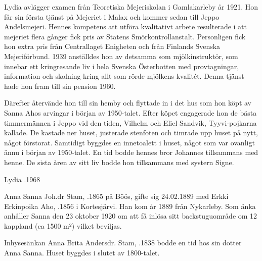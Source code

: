 Lydia avlägger examen från Teoretiska Mejeriskolan i Gamlakarleby år 1921. Hon får sin första tjänst på Mejeriet i Malax och kommer sedan till Jeppo Andelsmejeri. Hennes kompetens att utföra kvalitativt arbete resulterade i att mejeriet flera gånger fick pris av Statens Smörkontrollanstalt. Personligen fick hon extra pris från Centrallaget Enigheten och från Finlands Svenska Mejeriförbund. 1939 anställdes hon av detsamma som mjölkinstruktör, som innebar ett kringresande liv i hela Svenska Österbotten med provtagningar, information och skolning kring allt som rörde mjölkens kvalitét. Denna tjänst hade hon fram till sin pension 1960.

Därefter återvände hon till sin hemby och flyttade in i det hus som hon köpt av Sanna Ahos arvingar i början av 1950-talet. Efter köpet engagerade hon de bästa timmermännen i Jeppo vid den tiden, Vilhelm och Eliel Sandvik, Tyyvi-pojkarna kallade. De kastade ner huset, justerade stenfoten och timrade upp huset på nytt, något förstorat. Samtidigt byggdes en innetoalett i huset, något som var ovanligt ännu i början av 1950-talet. En tid bodde hennes bror Johannes tillsammans med henne. De sista åren av sitt liv bodde hon tillsammans med systern Signe.

Lydia .1968


%
Anna Sanna Joh.dr Stam, .1865 på Böös, gifte sig 24.02.1889 med Erkki Erkinpoika Aho, .1856 i Kortesjärvi. Han kom år 1889 från Nykarleby. Som änka anhåller Sanna den 23 oktober 1920 om att få inlösa sitt backstuguområde om 12 kappland (ca 1500 m²) vilket beviljas.
\begin{jhchildren}
  \item {}
  \item {}
  \item {}
  \item {}
\end{jhchildren}

Inhysesänkan Anna Brita Andersdr. Stam, .1838 bodde en tid hos sin dotter Anna Sanna. Huset byggdes i slutet av 1800-talet.



%



